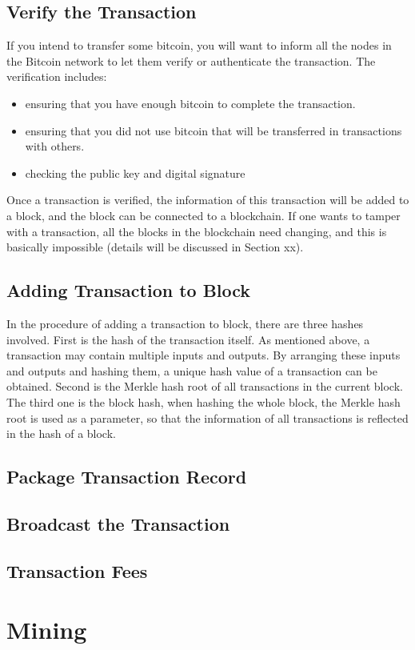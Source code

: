 \documentclass[12pt,a4paper]{article}
\begin{document}
\subsection{Verify the Transaction} 
If you intend to transfer some bitcoin, you will want to inform all the nodes in the Bitcoin network to let them verify or authenticate the transaction. The verification includes:
\begin{itemize}
	\item ensuring that you have enough bitcoin to complete the transaction.
	\item ensuring that you did not use bitcoin that will be transferred in transactions with others.
	\item checking the public key and digital signature
\end{itemize}
Once a transaction is verified, the information of this transaction will be added to a block, and the block can be connected to a blockchain. If one wants to tamper with a transaction, all the blocks in the blockchain need changing, and this is basically impossible (details will be discussed in Section xx).

\subsection{Adding Transaction to Block} 
In the procedure of adding a transaction to block, there are three hashes involved. First is the hash of the transaction itself. As mentioned above, a transaction may contain multiple inputs and outputs. By arranging these inputs and outputs and hashing them, a unique hash value of a transaction can be obtained. 
Second is the Merkle hash root of all transactions in the current block. 
The third one is the block hash, when hashing the whole block, the Merkle hash root is used as a parameter, so that the information of all transactions is reflected in the hash of a block.
\subsection{Package Transaction Record} 
\subsection{Broadcast the Transaction} 
\subsection{Transaction Fees}
\label{subsec:trans_fee}
\section{Mining}
\end{document}
